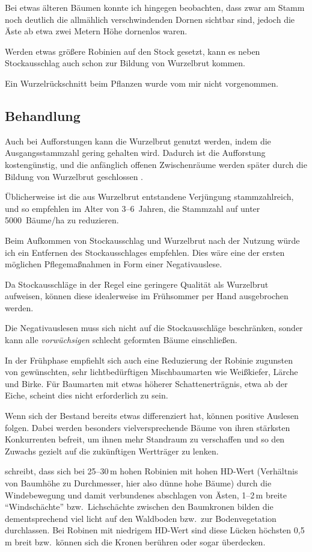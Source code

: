 \documentclass[twocolumn]{scrartcl}
\begin{document}
Bei etwas älteren Bäumen konnte ich hingegen beobachten, dass zwar am
Stamm noch deutlich die allmählich verschwindenden Dornen sichtbar
sind, jedoch die Äste ab etwa zwei Metern Höhe dornenlos waren.

Werden etwas größere Robinien auf den Stock gesetzt, kann es neben
Stockausschlag auch schon zur Bildung von Wurzelbrut kommen.

Ein Wurzelrückschnitt beim Pflanzen wurde vom mir nicht vorgenommen.

\subsection{Behandlung}

Auch bei Aufforstungen kann die Wurzelbrut genutzt werden, indem die
Ausgangsstammzahl gering gehalten wird. Dadurch ist die Aufforstung
kostengünstig, und die anfänglich offenen Zwischenräume werden später
durch die Bildung von Wurzelbrut geschlossen
\citep{larsen1935robinieWurzelbrut}.

Üblicherweise ist die aus Wurzelbrut entstandene Verjüngung
stammzahlreich, und so empfehlen \citet{redei2012robinieVerj} im Alter
von 3--6~Jahren, die Stammzahl auf unter 5000~Bäume/ha zu reduzieren.

Beim Aufkommen von Stockausschlag und Wurzelbrut nach der Nutzung
würde ich ein Entfernen des Stockausschlages empfehlen. Dies wäre eine
der ersten möglichen Pflegemaßnahmen in Form einer Negativauslese.

Da Stockausschläge in der Regel eine geringere Qualität als Wurzelbrut
aufweisen, können diese idealerweise im Frühsommer per Hand
ausgebrochen werden.

Die Negativauslesen muss sich nicht auf die Stockausschläge
beschränken, sonder kann alle \emph{vorwüchsigen} schlecht geformten
Bäume einschließen.

In der Frühphase empfiehlt sich auch eine Reduzierung der Robinie
zugunsten von gewünschten, sehr lichtbedürftigen Mischbaumarten wie
Weißkiefer, Lärche und Birke. Für Baumarten mit etwas höherer
Schattenerträgnis, etwa ab der Eiche, scheint dies nicht erforderlich
zu sein.

Wenn sich der Bestand bereits etwas differenziert hat, können positive
Auslesen folgen. Dabei werden besonders vielversprechende Bäume von
ihren stärksten Konkurrenten befreit, um ihnen mehr Standraum zu
verschaffen und so den Zuwachs gezielt auf die zukünftigen Wertträger
zu lenken.

\citet[S.~47]{bluemke1955robinie} schreibt, dass sich bei 25--30\,m
hohen Robinien mit hohen HD-Wert (Verhältnis von Baumhöhe zu
Durchmesser, hier also dünne hohe Bäume) durch die Windebewegung und
damit verbundenes abschlagen von Ästen, 1--2\,m breite
\enquote{Windschächte} bzw.\ Lichschächte zwischen den Baumkronen
bilden die dementsprechend viel licht auf den Waldboden bzw.\ zur
Bodenvegetation durchlassen.  Bei Robinen mit niedrigem HD-Wert sind
diese Lücken höchsten 0,5\,m breit bzw.\ können sich die Kronen
berühren oder sogar überdecken.
\end{document}
